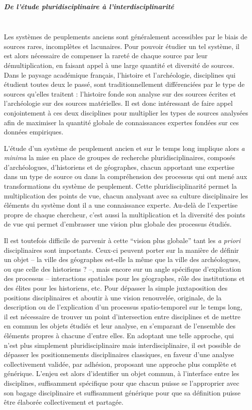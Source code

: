 \subparagraph{De l'étude pluridisciplinaire à l'interdisciplinarité}~\\

Les systèmes de peuplements anciens sont généralement accessibles par le biais de sources rares, incomplètes et lacunaires.
Pour pouvoir étudier un tel système, il est alors nécessaire de compenser la rareté de chaque source par leur démultiplication, en faisant appel à une large quantité et diversité de sources.
Dans le paysage académique français, l'histoire et l'archéologie, disciplines qui étudient toutes deux le passé, sont traditionnellement différenciées par le type de sources qu'elles traitent :
	l'histoire fonde son analyse sur des sources écrites et l'archéologie sur des sources matérielles.
Il est donc intéressant de faire appel conjointement à ces deux disciplines pour multiplier les types de sources analysées afin de maximiser la quantité globale de connaissances expertes fondées sur ces données empiriques.

L'étude d'un système de peuplement ancien et sur le temps long implique alors \textit{a minima} la mise en place de groupes de recherche pluridisciplinaires, composés d'archéologues, d'historiens et de géographes, chacun apportant une expertise dans un type de source ou dans la compréhension des processus qui ont mené aux transformations du système de peuplement.
Cette pluridisciplinarité permet la multiplication des points de vue, chacun analysant avec sa culture disciplinaire les éléments du système dont il a une connaissance experte.
Au-delà de l'expertise propre de chaque chercheur, c'est aussi la multiplication et la diversité des points de vue qui permet d'embrasser une vision plus globale des processus étudiés.

Il est toutefois difficile de parvenir à cette “vision plus globale” tant les \textit{a priori} disciplinaires sont importants.
Ceux-ci peuvent porter sur la manière de définir un objet – la ville des géographes est-elle la même que la ville des archéologues, ou que celle des historiens ? –, mais encore sur un angle spécifique d'explication des processus – interactions spatiales pour les géographes, rôle des institutions et des élites pour les historiens, etc.
Pour dépasser la simple juxtaposition des positions disciplinaires et aboutir à une vision renouvelée, originale, de la description ou de l'explication d'un processus spatio-temporel sur le temps long, il est nécessaire de trouver un point d'intersection entre disciplines et de mettre en commun les objets étudiés et leur analyse, en s'emparant de l'ensemble des éléments propres à chacune d'entre elles.
En adoptant une telle approche, qui n'est plus simplement pluridisciplinaire mais interdisciplinaire, il est possible de dépasser les positionnements disciplinaires classiques, en faveur d'une analyse collectivement validée, par adhésion, proposant une approche plus complète et générique.
L'enjeu est alors d'identifier un objet commun, à l'interface entre les disciplines, suffisamment spécifique pour que chacun puisse se l'approprier avec son bagage disciplinaire et suffisamment générique pour que sa définition puisse être élaborée collectivement et partagée.

